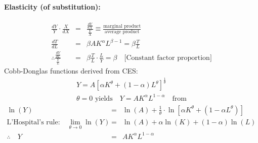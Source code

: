 \paragraph{Elasticity (of substitution):}
\begin{eqnarray*}
\frac{dY}{Y}\cdot\frac{X}{dX} &=& \frac{\frac{dY}{dX}}{\frac{Y}{X}} \equiv \frac{\text{marginal product}}{\text{average product}}\\
\frac{dT}{dL} &=& \beta AK^{\alpha}L^{\beta-1} = \beta\frac{T}{L}\\
\therefore \frac{\frac{dY}{dL}}{\frac{Y}{L}} &=& \beta\frac{T}{L}\cdot\frac{L}{Y} = \beta\quad\text{[Constant factor proportion]}
\end{eqnarray*}
Cobb-Donglas functions derived from CES:
\begin{eqnarray*}
Y=A[\alpha K^{\theta}+(1-\alpha)L^{\theta}]^{\frac{1}{\theta}} \\
\theta=0\text{ yields}\quad Y=AK^{\alpha}L^{1-\alpha}\quad\text{from}
\end{eqnarray*}
\begin{eqnarray*}
\ln(Y) &=& \ln(A)+\frac{1}{\theta}\cdot\ln[\alpha K^{\theta}+(1-\alpha L^{\theta})]\\
\text{L'Hospital's rule:}\quad\lim_{\theta\to 0}\ln(Y) &=& \ln(A)+\alpha\ln(K)+(1-\alpha)\ln(L)\\
\therefore\quad Y &=& AK^{\alpha}L^{1-\alpha}
\end{eqnarray*}
